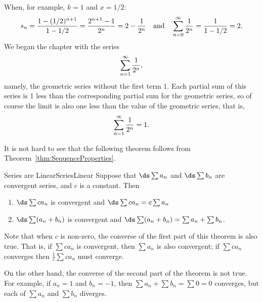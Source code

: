 When, for example, $k=1$ and $x=1/2$:
\[
  s_n={1-(1/2)^{n+1}\over 1-1/2}={2^{n+1}-1\over 2^n}=2-{1\over 2^n}
  \quad\hbox{and}\quad \sum_{n=0}^\infty {1\over 2^n} = 
  {1\over 1-1/2} = 2.
\]
We began the chapter with the series
\[\sum_{n=1}^\infty {1\over 2^n},\]
namely, the geometric series without the first term $1$. Each partial
sum of this series is 1 less than the corresponding partial sum for 
the geometric series, so of course the limit is also one less than the
value of the geometric series, that is,
\[\sum_{n=1}^\infty {1\over 2^n}=1.\]

It is not hard to see that the following theorem follows from
Theorem~\ref{thm:SequenceProperties}. 

\begin{theorem}{Series are Linear}{SeriesLinear}
Suppose that $\ds\sum a_n$ and $\ds\sum b_n$ are convergent series,
and $c$ is a constant. Then

\begin{enumerate}
\item $\ds\sum ca_n$ is convergent and $\ds\sum ca_n=c\sum a_n$
\item $\ds\sum (a_n+b_n)$ is convergent and $\ds\sum (a_n+b_n)=\sum a_n+\sum b_n$.
\end{enumerate}
\end{theorem}

Note that when $c$ is non-zero, the converse of the first part of this theorem is also true. That is, if $\sum ca_n$ is convergent, then $\sum a_n$ is also convergent; if $\sum ca_n$ converges then $\frac{1}{c}\sum ca_n$ must converge.

On the other hand, the converse of the second part of the theorem is not true. For example, if $a_n=1$ and $b_n=-1$, then $\sum a_n+\sum b_n=\sum 0=0$ converges, but each of $\sum a_n$ and $\sum b_n$ diverges.

%

